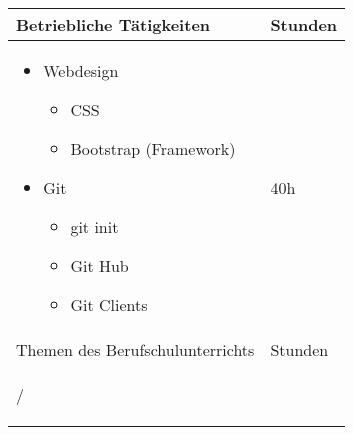 \begin{center}
	\begin{tabular}{ | p{30em}  | m{6em} | }
	\hline
	\rowcolor{Gray}
	Betriebliche T\"{a}tigkeiten & Stunden \\ \hline
	\begin{itemize}
	\item Webdesign
		\begin{itemize}
		\item CSS
		\item Bootstrap (Framework)
		\end{itemize}
	\item Git
		\begin{itemize}
		\item git init
		\item Git Hub
		\item Git Clients
		\end{itemize}
	\end{itemize} & \begin{center} 40h \end{center} \\ \hline
	\rowcolor{Gray}
	Themen des Berufschulunterrichts & Stunden \\ \hline
	\begin{center} /  \end{center} & \begin{center}  \end{center} \\ \hline
	\end{tabular}
\end{center}